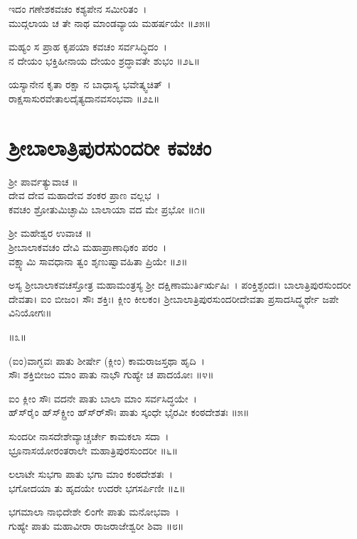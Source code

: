 ಇದಂ ಗಣೇಶಕವಚಂ ಕಶ್ಯಪೇನ ಸಮೀರಿತಂ~।\\
ಮುದ್ಗಲಾಯ ಚ ತೇ ನಾಥ ಮಾಂಡವ್ಯಾಯ ಮಹರ್ಷಯೇ ॥೨೫॥

ಮಹ್ಯಂ ಸ ಪ್ರಾಹ ಕೃಪಯಾ ಕವಚಂ ಸರ್ವಸಿದ್ಧಿದಂ~।\\
ನ ದೇಯಂ ಭಕ್ತಿಹೀನಾಯ ದೇಯಂ ಶ್ರದ್ಧಾವತೇ ಶುಭಂ ॥೨೬॥

ಯಸ್ಯಾನೇನ ಕೃತಾ ರಕ್ಷಾ ನ ಬಾಧಾಸ್ಯ ಭವೇತ್ಕ್ವಚಿತ್~।\\
ರಾಕ್ಷಸಾಸುರವೇತಾಲದೈತ್ಯದಾನವಸಂಭವಾ ॥೨೭॥

\section{ಶ್ರೀಬಾಲಾತ್ರಿಪುರಸುಂದರೀ ಕವಚಂ}
ಶ್ರೀ ಪಾರ್ವತ್ಯುವಾಚ ॥\\
ದೇವ ದೇವ ಮಹಾದೇವ ಶಂಕರ ಪ್ರಾಣ ವಲ್ಲಭ~।\\
ಕವಚಂ ಶ್ರೋತುಮಿಚ್ಛಾಮಿ ಬಾಲಾಯಾ ವದ ಮೇ ಪ್ರಭೋ ॥೧॥

ಶ್ರೀ ಮಹೇಶ್ವರ ಉವಾಚ ॥\\
ಶ್ರೀಬಾಲಾಕವಚಂ ದೇವಿ ಮಹಾಪ್ರಾಣಾಧಿಕಂ ಪರಂ~।\\
ವಕ್ಷ್ಯಾಮಿ ಸಾವಧಾನಾ ತ್ವಂ ಶೃಣುಷ್ವಾವಹಿತಾ ಪ್ರಿಯೇ ॥೨॥

ಅಸ್ಯ ಶ್ರೀಬಾಲಾಕವಚಸ್ತೋತ್ರ ಮಹಾಮಂತ್ರಸ್ಯ ಶ್ರೀ ದಕ್ಷಿಣಾಮುರ್ತಿರ್ಋಷಿಃ~। ಪಂಕ್ತಿಶ್ಛಂದಃ। ಬಾಲಾತ್ರಿಪುರಸುಂದರೀ ದೇವತಾ। ಐಂ ಬೀಜಂ। ಸೌಃ ಶಕ್ತಿಃ। ಕ್ಲೀಂ ಕೀಲಕಂ। ಶ್ರೀಬಾಲಾತ್ರಿಪುರಸುಂದರೀದೇವತಾ ಪ್ರಸಾದಸಿದ್ಧ್ಯರ್ಥೇ ಜಪೇ ವಿನಿಯೋಗಃ॥

॥೩॥

(ಐಂ)ವಾಗ್ಭವಃ ಪಾತು ಶೀರ್ಷೇ (ಕ್ಲೀಂ) ಕಾಮರಾಜಸ್ತಥಾ ಹೃದಿ~।\\
ಸೌಃ ಶಕ್ತಿಬೀಜಂ ಮಾಂ ಪಾತು ನಾಭೌ ಗುಹ್ಯೇ ಚ ಪಾದಯೋಃ ॥೪॥

ಐಂ ಕ್ಲೀಂ ಸೌಃ ವದನೇ ಪಾತು ಬಾಲಾ ಮಾಂ ಸರ್ವಸಿದ್ಧಯೇ~।\\
ಹ್‌ಸ್‌ರೈಂ ಹ್‌ಸ್‌ಕ್ಲ್ರೀಂ ಹ್‌ಸ್‌ರ್‌ಸೌಃ ಪಾತು ಸ್ಕಂಧೇ ಭೈರವೀ ಕಂಠದೇಶತಃ ॥೫॥

ಸುಂದರೀ ನಾಸದೇಶೇವ್ಯಾಚ್ಚರ್ಚೇ ಕಾಮಕಲಾ ಸದಾ~।\\
ಭ್ರೂನಾಸಯೋರಂತರಾಲೇ ಮಹಾತ್ರಿಪುರಸುಂದರೀ ॥೬॥

ಲಲಾಟೇ ಸುಭಗಾ ಪಾತು ಭಗಾ ಮಾಂ ಕಂಠದೇಶತಃ~।\\
ಭಗೋದಯಾ ತು ಹೃದಯೇ ಉದರೇ ಭಗಸರ್ಪಿಣೀ ॥೭॥

ಭಗಮಾಲಾ ನಾಭಿದೇಶೇ ಲಿಂಗೇ ಪಾತು ಮನೋಭವಾ~।\\
ಗುಹ್ಯೇ ಪಾತು ಮಹಾವೀರಾ ರಾಜರಾಜೇಶ್ವರೀ ಶಿವಾ ॥೮॥

